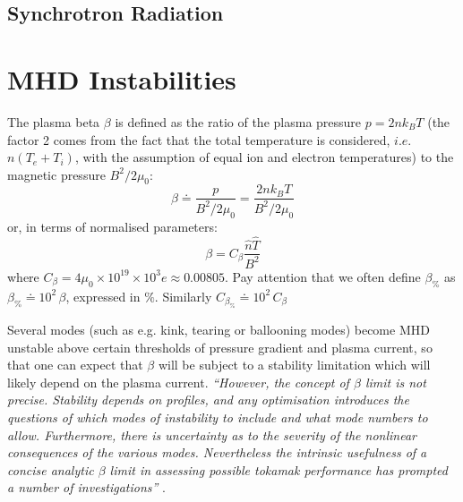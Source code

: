 
\subsection{Synchrotron Radiation}



\section{MHD Instabilities}
The plasma beta $\beta$ is defined as the ratio of the plasma pressure $p=2nk_BT$ (the factor 2 comes from the fact that the total temperature is considered, $i.e.$ $n(T_e+T_i)$, with the assumption of equal ion and electron temperatures) to the magnetic pressure $B^2/2\mu_0$:
\begin{equation}
	\beta
	\doteq 
	\frac{p}{B^2/2\mu_0}
	=
	\frac{2 n k_B T}{B^2/2\mu_0}
\end{equation}
or, in terms of normalised parameters:
\begin{equation}
	\beta
	=
	C_\beta \frac{\hat n \hat T}{B^2}
\label{eqn:beta_adv}
\end{equation}
where $C_\beta = 4\mu_0\times 10^{19}\times 10^3 e \approx 0.00805$. Pay attention that we often define $\beta_\%$ as $\beta_\% \doteq 10^2\, \beta$,  expressed in $\%$. Similarly $C_{\beta_\%} \doteq 10^2\, C_{\beta}$


Several modes (such as e.g. kink, tearing or ballooning modes) become MHD unstable above certain thresholds of pressure gradient and plasma current, so that one can expect that $\beta$ will be subject to a stability limitation which will likely depend on the plasma current. \emph{``However, the concept of $\beta$ limit is not precise. Stability depends on profiles, and any optimisation introduces the questions of which modes of instability to include and what mode numbers to allow. Furthermore, there is uncertainty as to the severity of the nonlinear consequences of the various modes. Nevertheless the intrinsic usefulness of a concise analytic $\beta$ limit in assessing possible tokamak performance has prompted a number of investigations''} .

